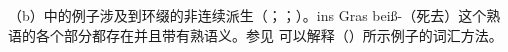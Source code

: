\begin{exe}
\begin{xlist}[iv.]
\begin{exe}
\begin{xlist}[iv.]
{}
\zl
（b）中的例子涉及到环缀\gee 的非连续派生（\citealp[\S~3.4.3]{Luedeling2001a}；\citealp[--327, 372--377]{Mueller2002b}；\citealp[\S~2.2.1, \S~5.2.1]{Mueller2003a}）。ins Gras beiß-（死去）这个熟语的各个部分都存在并且带有熟语义。参见 可以解释（）所示例子的词汇方法。





\end{xlist}
\end{exe}
\end{xlist}
\end{exe}
